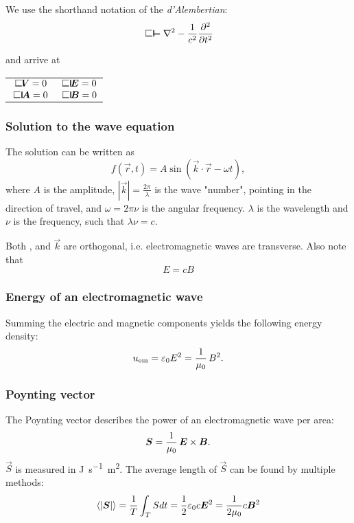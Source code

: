         We use the shorthand notation of the \textit{d'Alembertian}: 
        \begin{equation*}
            \dalambert = \nabla^2 - \frac{1}{c^2}\frac{\partial^2}{\partial t^2}
        \end{equation*}

        and arrive at
        \begin{center}
            \begin{tabular}{ c|c }
                $\dalambert V = 0$&$ \dalambert\,\E = 0$\\
                $\dalambert\,\vec{A} = 0 $&$\dalambert\,\B = 0$
            \end{tabular}
        \end{center}
    \subsubsection{Solution to the wave equation}
        The solution  can be written as
        \begin{equation*}
            f(\vec{r}, t) = A\sin\left(\vec{k}\cdot\vec{r} - \omega t\right),
        \end{equation*}
        where $A$ is the amplitude, $|\vec{k}| = \frac{2\pi}{\lambda}$ is the wave "number", pointing in the direction of travel, 
        and $\omega = 2\pi\nu$ is the angular frequency. $\lambda$ is the wavelength and $\nu$ is the frequency, such that
        $\lambda\nu = c$.

        Both \E, \B{} and $\vec{k}$ are orthogonal, i.e. electromagnetic waves are transverse. Also note that 
        \begin{equation}
            E = cB
        \end{equation}

    \subsubsection{Energy of an electromagnetic wave}
        Summing the electric and magnetic components yields the following energy density: 
        \begin{equation}
            u_{\text{em}} = \varepsilon_0 E^2 = \frac{1}{\mu_0}\, B^2.
        \end{equation}
    
    \subsubsection{Poynting vector}
        The Poynting vector describes the power of an electromagnetic wave per area:
        \begin{equation}
            \bm{S} = \frac{1}{\mu_0}\,\bm{E}\times\bm{B}.
        \end{equation}
        $\vec{S}$ is measured in \si{\joule\per\second\metre\squared}.
        The average length of $\vec{S}$ can be found by multiple methods:
        \begin{equation}
            \left<|\vec{S}|\right> = \frac{1}{T}\int_T Sdt = \frac{1}{2}\e c\E^2 = \frac{1}{2\mu_0}c\B^2
        \end{equation}
    
